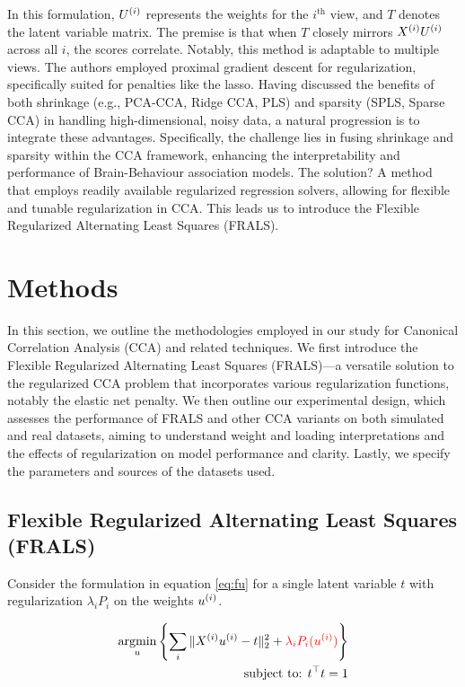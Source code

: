 In this formulation, \(U^{(i)}\) represents the weights for the $i^{\text{th}}$ view, and \(T\) denotes the latent variable matrix. The premise is that when \(T\) closely mirrors \(X^{(i)} U^{(i)}\) across all \(i\), the scores correlate.
Notably, this method is adaptable to multiple views.
The authors employed proximal gradient descent for regularization, specifically suited for penalties like the lasso.
Having discussed the benefits of both shrinkage (e.g., PCA-CCA, Ridge CCA, PLS) and sparsity (SPLS, Sparse CCA) in handling high-dimensional, noisy data, a natural progression is to integrate these advantages.
Specifically, the challenge lies in fusing shrinkage and sparsity within the CCA framework, enhancing the interpretability and performance of Brain-Behaviour association models.
The solution?
A method that employs readily available regularized regression solvers, allowing for flexible and tunable regularization in CCA.
This leads us to introduce the Flexible Regularized Alternating Least Squares (FRALS).

\section{Methods}

In this section, we outline the methodologies employed in our study for Canonical Correlation Analysis (CCA) and related techniques.
We first introduce the Flexible Regularized Alternating Least Squares (FRALS)—a versatile solution to the regularized CCA problem that incorporates various regularization functions, notably the elastic net penalty\cite{zou2005regularization}.
We then outline our experimental design, which assesses the performance of FRALS and other CCA variants on both simulated and real datasets, aiming to understand weight and loading interpretations and the effects of regularization on model performance and clarity.
Lastly, we specify the parameters and sources of the datasets used.

\subsection{Flexible Regularized Alternating Least Squares (FRALS)}\label{subsec:flexible-regularized-alternating-least
-squares-(frals)}

Consider the formulation in equation \ref{eq:fu} for a single latent variable \(t\) with regularization $\lambda_i P_i$ on the weights \(u^{(i)}\).

\begin{align}
    \underset{u}{\mathrm{argmin}}\left\{\sum_i \|X^{(i)} u^{(i)} - t\|_2^2 + \textcolor{red}{\lambda_i P_i(u^{(i)})} \right\}\\
    \text{subject to: }t^\top t = 1\\
\end{align}

